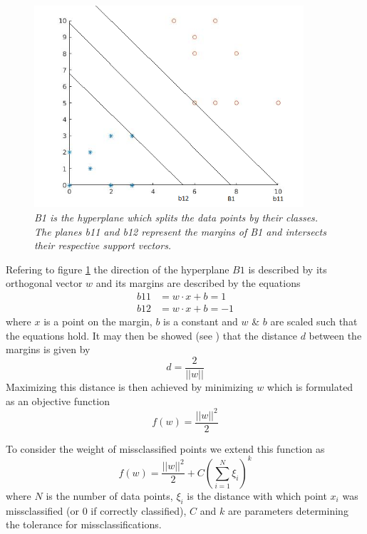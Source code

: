 \documentclass{article}
\begin{document}
\begin{figure}[H]
	\centering
	\includegraphics[width=10cm]{svm_plot}
	\caption{\textit{B1 is the hyperplane which splits the data points by their classes. The planes b11 and b12 represent the margins of B1 and intersects their respective support vectors.}}
	\label{fig:hyperplane}
\end{figure}

Refering to figure \ref{fig:hyperplane} the direction of the hyperplane $B1$ is described by its orthogonal vector $w$ and its margins are described by the equations
\begin{align}
b11 &= w\cdot x + b = 1\\
b12 &= w \cdot x + b = -1
\end{align}
where $x$ is a point on the margin, $b$ is a constant and $w$ \& $b$ are scaled such that the equations hold. It may then be showed (see \cite{svm-graph-kernels}) that the distance $d$ between the margins is given by
\begin{equation}
d = \frac{2}{||w||}
\end{equation}
Maximizing this distance is then achieved by minimizing $w$ which is formulated as an objective function
\begin{equation}
f(w) = \frac{||w||^2}{2}
\end{equation}

To consider the weight of missclassified points we extend this function as
\begin{equation}
f(w) = \frac{||w||^2}{2} + C\left(\sum_{i=1}^{N}\xi_i\right)^k
\end{equation}
where $N$ is the number of data points, $\xi_i$ is the distance with which point $x_i$ was missclassified (or 0 if correctly classified), $C$ and $k$ are parameters determining the tolerance for missclassifications.
\end{document}

